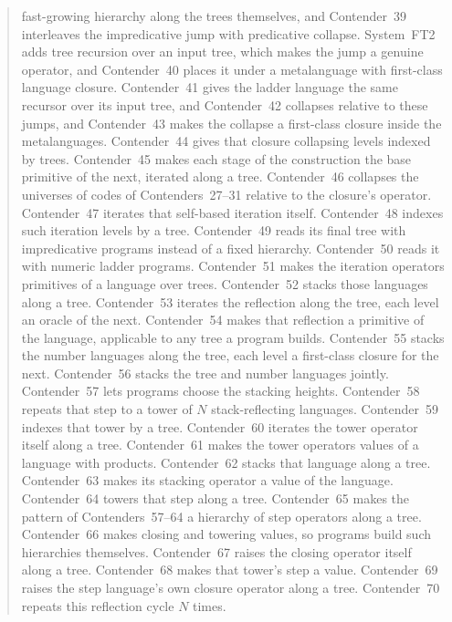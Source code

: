 \documentclass[11pt]{article}
\theoremstyle{definition}
\theoremstyle{remark}
\begin{document}
\begin{abstract}
fast-growing hierarchy along the trees themselves, and Contender~39 interleaves
the impredicative jump with predicative collapse. System~FT2 adds tree recursion
over an input tree, which makes the jump a genuine operator, and Contender~40
places it under a metalanguage with first-class language closure. Contender~41
gives the ladder language the same recursor over its input tree, and
Contender~42 collapses relative to these jumps, and Contender~43 makes the
collapse a first-class closure inside the metalanguages. Contender~44 gives
that closure collapsing levels indexed by trees.
Contender~45 makes each stage of the construction the base primitive of the
next, iterated along a tree.
Contender~46 collapses the universes of codes of Contenders~27--31
relative to the closure's operator.
Contender~47 iterates that self-based iteration itself.
Contender~48 indexes such iteration levels by a tree.
Contender~49 reads its final tree with impredicative programs instead of a
fixed hierarchy.
Contender~50 reads it with numeric ladder programs.
Contender~51 makes the iteration operators primitives of a language over
trees.
Contender~52 stacks those languages along a tree.
Contender~53 iterates the reflection along the tree, each level an oracle of
the next.
Contender~54 makes that reflection a primitive of the language, applicable
to any tree a program builds.
Contender~55 stacks the number languages along the tree, each level a
first-class closure for the next.
Contender~56 stacks the tree and number languages jointly.
Contender~57 lets programs choose the stacking heights.
Contender~58 repeats that step to a tower of $N$ stack-reflecting languages.
Contender~59 indexes that tower by a tree.
Contender~60 iterates the tower operator itself along a tree.
Contender~61 makes the tower operators values of a language with products.
Contender~62 stacks that language along a tree.
Contender~63 makes its stacking operator a value of the language.
Contender~64 towers that step along a tree.
Contender~65 makes the pattern of Contenders~57--64 a hierarchy of step
operators along a tree.
Contender~66 makes closing and towering values, so programs build such
hierarchies themselves.
Contender~67 raises the closing operator itself along a tree.
Contender~68 makes that tower's step a value.
Contender~69 raises the step language's own closure operator along a tree.
Contender~70 repeats this reflection cycle $N$ times.
\end{abstract}

\tableofcontents

\end{document}
